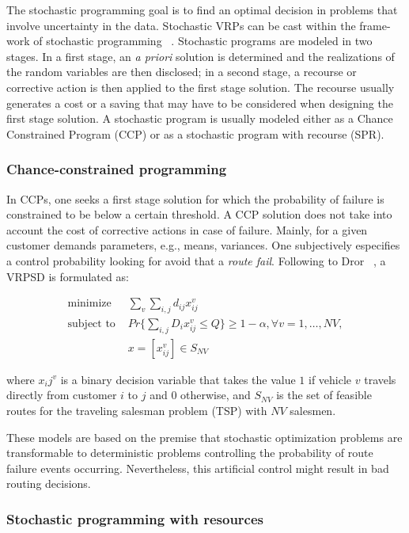 The stochastic programming goal is to find an optimal decision in problems that involve uncertainty in the data. Stochastic VRPs can be cast within the frame-work of stochastic programming ~\cite{gendreau_stochastic_1996}. Stochastic programs are modeled in two stages. In a first stage, an \textit{a priori} solution is determined and the realizations of the random variables are then disclosed; in a second stage, a recourse or corrective action is then applied to the first stage solution. The recourse usually generates a cost or a saving that may have to be considered when designing the first stage solution. A stochastic program is usually modeled either as a Chance Constrained Program (CCP) or as a stochastic program with recourse (SPR). 

 
\subsubsection{Chance-constrained programming}

In CCPs, one seeks a first stage solution for which the probability of failure is constrained to be below a certain threshold. A CCP solution does not take into account the cost of corrective actions in case of failure. Mainly, for a given customer demands parameters, e.g., means, variances. One subjectively especifies a control probability looking for avoid that a \textit{route fail}. Following to Dror ~\cite{Dror_2005}, a VRPSD is formulated as:

\begin{align}\label{eq:CCP}
 \text{minimize } & \sum_v\sum_{i,j}d_{ij}x_{ij}^v\\
 \text{subject to } & Pr\{\sum_{i,j}D_ix_{ij}^v \leq Q\} \geq 1-\alpha, \forall v = 1,\ldots,NV,\\
  & x = [x_{ij}^v] \in S_{NV}
\end{align}

where $x_ij^v$ is a binary decision variable that takes the value $1$ if vehicle $v$ travels directly from customer $i$ to $j$ and $0$ otherwise, and $S_{NV}$ is the set of feasible routes for the traveling salesman problem (TSP) with $NV$ salesmen.

These models are based on the premise that stochastic optimization problems are transformable to deterministic problems controlling the probability of route failure events occurring. Nevertheless, this artificial control might result in bad routing decisions.


\subsubsection{Stochastic programming with resources}

